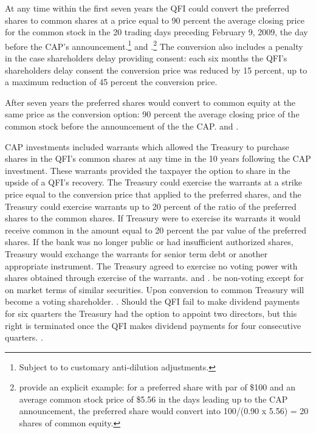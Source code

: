 \documentclass[12pt]{article}
\begin{document}
At any time within the first seven years the QFI could convert the preferred shares to common shares at a price equal to 90 percent the average closing price for the common stock in the 20 trading days preceding February 9, 2009, the day before the CAP's announcement.\footnote{Subject to to customary anti-dilution adjustments.} \citep{WhitePaper} and \citep{GW}.\footnote{\citet{GW} provide an explicit example: for a preferred share with par of \$100 and an average common stock price of \$5.56 in the days leading up to the CAP announcement, the preferred share would convert into 100/(0.90 x 5.56) = 20 shares of common equity.} The conversion also includes a penalty in the case shareholders delay providing consent: each six months the QFI's shareholders delay consent the conversion price was reduced by 15 percent, up to a maximum reduction of 45 percent the conversion price.


After seven years the preferred shares would convert to common equity at the same price as the conversion option: 90 percent the average closing price of the common stock before the announcement of the the CAP. \citep{WhitePaper} and \citep{GW}.


CAP investments included warrants which allowed the Treasury to purchase shares in the QFI's common shares at any time in the 10 years following the CAP investment. These warrants provided the taxpayer the option to share in the upside of a QFI's recovery. The Treasury could exercise the warrants at a strike price equal to the conversion price that applied to the preferred shares, and the Treasury could exercise warrants up to 20 percent of the ratio of the preferred shares to the common shares. If Treasury were to exercise its warrants it would receive common in the amount equal to 20 percent the par value of the preferred shares. If the bank was no longer public or had insufficient authorized shares, Treasury would exchange the warrants for senior term debt or another appropriate instrument. The Treasury agreed to exercise no voting power with shares obtained through exercise of the warrants. \citep{WhitePaper} and \citep{GW}. be non-voting except for on market terms of similar securities. Upon conversion to common Treasury will become a voting shareholder. \citep{Mofo}. Should the QFI fail to make dividend payments for six quarters the Treasury had the option to appoint two directors, but this right is terminated once the QFI makes dividend payments for four consecutive quarters. \citep{Mofo}.
\end{document}

